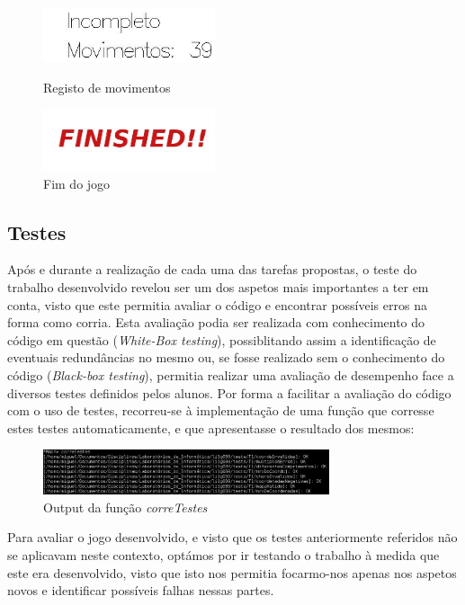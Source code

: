 \documentclass[a4paper]{article}
\begin{document}
\begin{figure}[ht]
	\centering
	\includegraphics[width=0.45\textwidth]{assets/contadorMovimentos.jpg} 
	\caption{Registo de movimentos}
	 \includegraphics[width=0.45\textwidth]{assets/final.jpg} 
	 \caption{Fim do jogo}
\end{figure}

\subsection{Testes}

Após e durante a realização de cada uma das tarefas propostas, o teste do trabalho desenvolvido revelou ser um dos aspetos mais importantes a ter em conta, visto que este permitia avaliar o código e encontrar possíveis erros na forma como corria. Esta avaliação podia ser realizada com conhecimento do código em questão (\textit{White-Box testing}), possiblitando assim a identificação de eventuais redundâncias no mesmo ou, se fosse realizado sem o conhecimento do código (\textit{Black-box testing}), permitia realizar uma avaliação de desempenho face a diversos testes definidos pelos alunos. Por forma a facilitar a avaliação do código com o uso de testes, recorreu-se à implementação de uma função que corresse estes testes automaticamente, e que apresentasse o resultado dos mesmos:

\begin{figure}[ht]
	\centering
	\includegraphics[width=0.75\textwidth]{assets/testeExemplo.jpg}
	\caption{Output da função \emph{correTestes}}
\end{figure}

Para avaliar o jogo desenvolvido, e visto que os testes anteriormente referidos não se aplicavam neste contexto, optámos por ir testando o trabalho à medida que este era desenvolvido, visto que isto nos permitia focarmo-nos apenas nos aspetos novos e identificar possíveis falhas nessas partes. 
\end{document}
